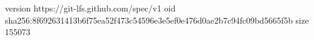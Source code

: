 version https://git-lfs.github.com/spec/v1
oid sha256:8f692631413b6f75ea52f473c54596e3e5ef0e476d0ae2b7c94fc09bd5665f5b
size 155073
